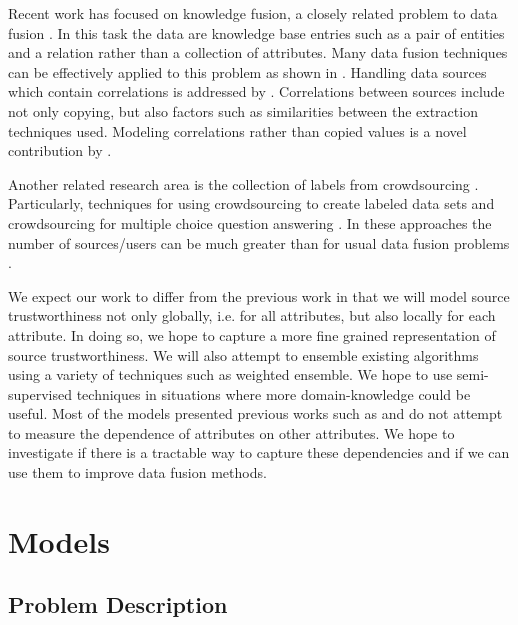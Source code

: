 \documentclass{acm_proc_article-sp}
\begin{document}
Recent work has focused on knowledge fusion, a closely related problem to data fusion \cite{dong:data} \cite{pochampally:fusing} \cite{yu:wisdom}.  In this task the data are knowledge base entries such as a pair of entities and a relation rather than a collection of attributes. Many data fusion techniques can be effectively applied to this problem as shown in \cite{dong:data}. Handling data sources which contain correlations is addressed by \cite{pochampally:fusing}. Correlations between sources include not only copying, but also factors such as similarities between the extraction techniques used. Modeling correlations rather than copied values is a novel contribution by  \cite{pochampally:fusing}.


Another related research area is the collection of labels from crowdsourcing \cite{nguyen:minimizing}. Particularly, techniques for using crowdsourcing to create labeled data sets \cite{sheng:get} \cite{nguyen:minimizing} and crowdsourcing for multiple choice question answering \cite{bachrach:grade}. In these approaches the number of sources/users can be much greater than for usual data fusion problems \cite{li:truth} \cite{nguyen:minimizing}.

We expect our work to differ from the previous work in that we will model source trustworthiness not only globally, i.e. for all attributes, but also locally for each attribute. In doing so, we hope to capture a more fine grained representation of source trustworthiness. We will also attempt to ensemble existing algorithms using a variety of techniques such as weighted ensemble. We hope to use semi-supervised techniques in situations where more domain-knowledge could be useful. Most of the models presented previous works such as \cite{pasternack:latent} and \cite{li:resolving} do not attempt to measure the dependence of attributes on other attributes. We hope to investigate if there is a tractable way to capture these dependencies and if we can use them to improve data fusion methods.

\section{Models}

\subsection{Problem Description}
\end{document}
